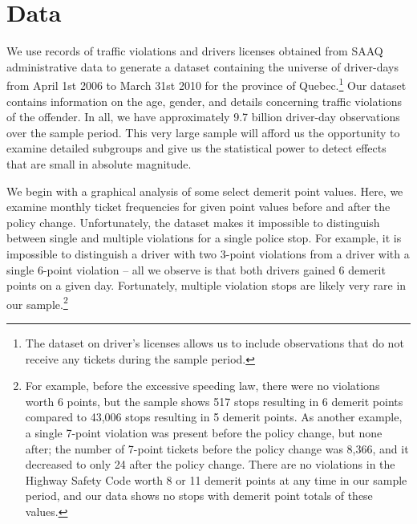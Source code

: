 \section{Data}
\label{sec:Data}


We use records of traffic violations and drivers licenses obtained from SAAQ administrative data to generate a dataset containing the universe of driver-days from April 1st 2006 to March 31st 2010 for the province of Quebec.\footnote{%
The dataset on driver’s licenses allows us to include observations that do not receive any tickets during the sample period.}  
Our dataset contains information on the age, gender, and details concerning traffic violations of the offender. In all, we have approximately 9.7 billion driver-day observations over the sample period. This very large sample will afford us the opportunity to examine detailed subgroups and give us the statistical power to detect effects that are small in absolute magnitude.

We begin with a graphical analysis of some select demerit point values. Here, we examine monthly ticket frequencies for given point values before and after the policy change. Unfortunately, the dataset makes it impossible to distinguish between single and multiple violations for a single police stop. For example, it is impossible to distinguish a driver with two 3-point violations from a driver with a single 6-point violation – all we observe is that both drivers gained 6 demerit points on a given day. Fortunately, multiple violation stops are likely very rare in our sample.\footnote{%
For example, before the excessive speeding law, there were no violations worth 6 points, but the sample shows 517 stops resulting in 6 demerit points compared to 43,006 stops resulting in 5 demerit points. As another example, a single 7-point violation was present before the policy change, but none after; the number of 7-point tickets before the policy change was 8,366, and it decreased to only 24 after the policy change. There are no violations in the Highway Safety Code worth 8 or 11 demerit points at any time in our sample period, and our data shows no stops with demerit point totals of these values.}

